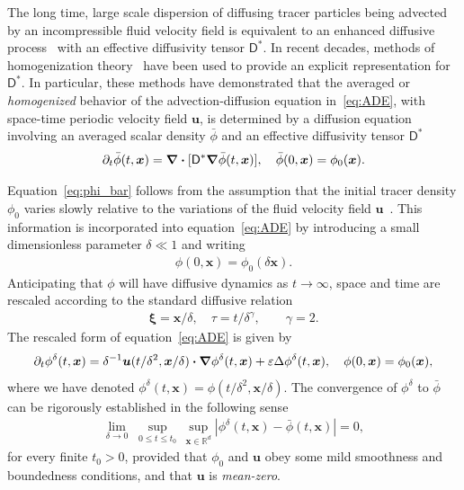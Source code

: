 \documentclass[leqno,onefignum,onetabnum]{siamltex1213}
\newcommand{\Dm}{\mathsf{D}}
\newcommand\bnabla{\mbox{\boldmath${\nabla}$}}
\providecommand\bcdot{\boldsymbol{\cdot}}
\newcommand{\vecx}{\boldsymbol{x}}
\newcommand{\vecu}{\boldsymbol{u}}
\newcommand{\vecxi}{\boldsymbol{\xi}}
\begin{document}
The long time, large scale dispersion of diffusing tracer particles
being advected by an incompressible fluid velocity field is equivalent
to an enhanced diffusive process~\cite{Taylor:PRSL:196} with an
effective diffusivity tensor $\Dm^*$. In recent decades, methods of
homogenization
theory~\cite{McLaughlin:SIAM_JAM:780,Fannjiang:1994:SIAM_JAM:333,Majda:Kramer:1999:book}
have been used to provide an explicit representation for
$\Dm^*$. In particular, these methods have demonstrated that the
averaged or \emph{homogenized} behavior of the advection-diffusion
equation in~\eqref{eq:ADE}, with space-time periodic velocity field
$\vecu$, is determined by a diffusion equation
involving an averaged scalar density $\bar{\phi}$ and an
effective diffusivity tensor
$\Dm^*$~\cite{Majda:Kramer:1999:book}       
%
\begin{align}\label{eq:phi_bar}
 \partial_t\bar{\phi}(t,\vecx)=\bnabla\bcdot[\Dm^*\bnabla \bar{\phi}(t,\vecx)], \quad
  \bar{\phi}(0,\vecx)=\phi_0(\vecx).
\end{align}




Equation~\eqref{eq:phi_bar}
follows from the assumption that the
initial tracer density $\phi_0$ varies slowly relative to the variations
of the fluid velocity field 
$\vecu$~\cite{McLaughlin:SIAM_JAM:780,Fannjiang:1997:1033,Majda:Kramer:1999:book}.
This information is incorporated into equation~\eqref{eq:ADE} by
introducing a small dimensionless parameter $\delta\ll1$ and
writing~\cite{McLaughlin:SIAM_JAM:780,Fannjiang:1997:1033,Majda:Kramer:1999:book}      
%
\begin{align}
  \phi(0,\vecx)=\phi_0(\delta\vecx). 
\end{align}
%
Anticipating that $\phi$ will have diffusive dynamics as $t\to\infty$, space and 
time are rescaled according to the standard diffusive relation
%
\begin{align}\label{eq:Fast_Vars}
  \vecxi=\vecx/\delta, \quad
  \tau= t/\delta^\gamma,
  \qquad
  \gamma=2.
\end{align}
%
The rescaled form of equation~\eqref{eq:ADE} is given
by~\cite{Majda:Kramer:1999:book}  
%
\begin{align}\label{eq:ADE_delta}
  \partial_t\phi^\delta(t,\vecx)=\delta^{-1}\vecu(t/\delta^2,\vecx/\delta)\bcdot\bnabla\phi^\delta(t,\vecx)
              +\varepsilon\Delta\phi^\delta(t,\vecx),
              \quad
             \phi(0,\vecx)=\phi_0(\vecx), 
\end{align}
%
where we have denoted $\phi^\delta(t,\vecx)=\phi(t/\delta^2,\vecx/\delta)$.
The convergence of $\phi^\delta$  to $\bar{\phi}$
 can be rigorously established in the following
sense~\cite{Majda:Kramer:1999:book}   
%
\begin{align}\label{eq:Homogenization_Theorem}
  \lim_{\delta\to0}\;\sup_{0\leq t\leq t_0}\,\sup_{\vecx\in\mathbb{R}^d}
  |\phi^\delta(t,\vecx)-\bar{\phi}(t,\vecx)| =0,
\end{align}
%
for every finite $t_0>0$, provided that $\phi_0$ and $\vecu$ obey some
mild smoothness and boundedness conditions, and that $\vecu$ is
\emph{mean-zero}.  
\end{document}
